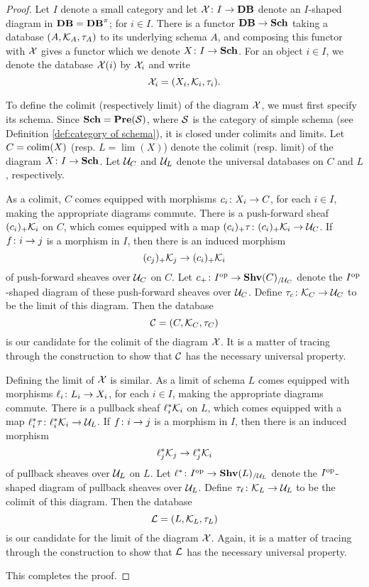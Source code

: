 \documentclass{amsart}
\def\Sch{{\bf Sch}}
\def\Data{{\bf DB}}
\begin{document}
\begin{proof}

Let $I$ denote a small category and let $\mcX\taking I\to\Data$ denote an $I$-shaped diagram in $\Data=\Data^\pi$; for $i\in I$.  There is a functor $\Data\to\Sch$ taking a database $(A,\mathcal{K}_A,\tau_A)$ to its underlying schema $A$, and composing this functor with $\mathcal{X}$ gives a functor which we denote $X\taking I\to\Sch$.  For an object $i\in I$, we denote the database $\mathcal{X}(i)$ by $\mathcal{X}_i$ and write $$\mathcal{X}_i=(X_i,\mathcal{K}_i,\tau_i).$$

To define the colimit (respectively limit) of the diagram $\mathcal{X}$, we must first specify its schema.  Since $\Sch=\Pre(\mcS)$, where $\mathcal{S}$ is the category of simple schema (see Definition \ref{def:category of schema}), it is closed under colimits and limits.  Let $C=\mathop{\textnormal{colim}}(X)$ (resp. $L=\lim(X)$) denote the colimit (resp. limit) of the diagram $X\taking I\to\Sch$.  Let $\mathcal{U}_C$ and $\mathcal{U}_L$ denote the universal databases on $C$ and $L$, respectively.

As a colimit, $C$ comes equipped with morphisms $c_i\colon X_i\rightarrow C$, for each $i\in I$, making the appropriate diagrams commute.  There is a push-forward sheaf $(c_i)_+\mathcal{K}_i$ on $C$, which comes equipped with a map $(c_i)_+\tau\colon (c_i)_+\mathcal{K}_i\rightarrow\mathcal{U}_C$.  If $f\colon i\rightarrow j$ is a morphism in $I$, then there is an induced morphism $$(c_j)_+\mathcal{K}_j\rightarrow (c_i)_+\mathcal{K}_i$$ of push-forward sheaves over $\mathcal{U}_C$ on $C$.  Let $c_+\colon I^\textnormal{op}\rightarrow{\bf Shv}(C)_{/\mathcal{U}_C}$ denote the $I^\textnormal{op}$-shaped diagram of these push-forward sheaves over $\mathcal{U}_C$.  Define $\tau_c\colon\mathcal{K}_C\rightarrow\mathcal{U}_C$ to be the limit of this diagram.  Then the database $$\mathcal{C}=(C,\mathcal{K}_C,\tau_C)$$ is our candidate for the colimit of the diagram $\mathcal{X}$.  It is a matter of tracing through the construction to show that $\mathcal{C}$ has the necessary universal property.

Defining the limit of $\mathcal{X}$ is similar.  As a limit of schema $L$ comes equipped with morphisms $\ell_i\colon L_i\rightarrow X_i$, for each $i\in I$, making the appropriate diagrams commute.  There is a pullback sheaf $\ell_i^*\mathcal{K}_i$ on $L$, which comes equipped with a map $\ell_i^*\tau\colon\ell_i^*\mathcal{K}_i\rightarrow\mathcal{U}_L$.  If $f\colon i\rightarrow j$ is a morphism in $I$, then there is an induced morphism $$\ell_j^*\mathcal{K}_j\rightarrow\ell_j^*\mathcal{K}_i$$ of pullback sheaves over $\mathcal{U}_L$ on $L$.  Let $\ell^*\colon I^\textnormal{op}\rightarrow{\bf Shv}(L)_{/\mathcal{U}_L}$ denote the $I^\textnormal{op}$-shaped diagram of pullback sheaves over $\mathcal{U}_L$.  Define $\tau_\ell\colon\mathcal{K}_L\rightarrow\mathcal{U}_L$ to be the colimit of this diagram.  Then the database $$\mathcal{L}=(L,\mathcal{K}_L,\tau_L)$$ is our candidate for the limit of the diagram $\mathcal{X}$.  Again, it is a matter of tracing through the construction to show that $\mathcal{L}$ has the necessary universal property.  

This completes the proof.

\end{proof}
\end{document}
